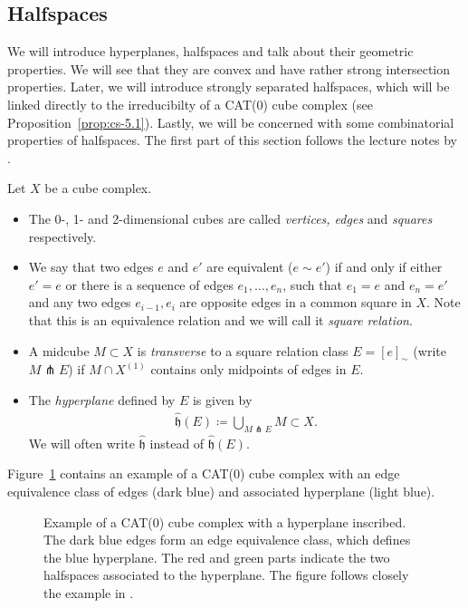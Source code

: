 \subsection{Halfspaces}
\label{sec:halfspaces}
We will introduce hyperplanes, halfspaces and talk about their geometric properties. We will see that they are convex and have rather strong intersection properties. Later, we will introduce strongly separated halfspaces, which will be linked directly to the irreducibilty of a CAT(0) cube complex (see Proposition~\ref{prop:cs-5.1}). Lastly, we will be concerned with some combinatorial properties of halfspaces. The first part of this section follows the lecture notes by \textcite{Rolli2012}.

\begin{defin}[Hyperplanes]
  Let \(X\) be a cube complex.
  \begin{itemize}
  \item The 0-, 1- and 2-dimensional cubes are called \emph{vertices, edges} and \emph{squares} respectively.
  \item We say that two edges \(e\) and \(e'\) are equivalent (\(e \sim e'\)) if and only if either \(e' = e\) or there is a sequence of edges \(e_1, \dots, e_n\), such that \(e_1 = e\) and \(e_n = e'\) and any two edges \(e_{i-1}, e_i\) are opposite edges in a common square in \(X\). Note that this is an equivalence relation and we will call it \emph{square relation}.
  \item A midcube \(M \subset X\) is \emph{transverse} to a square relation class \(E = [e]_\sim\) (write \(M \pitchfork E\)) if \(M \cap X^{(1)}\) contains only midpoints of edges in \(E\).
  \item The \emph{hyperplane} defined by \(E\) is given by
    \begin{align*}
      \mathfrak{\hat h}(E) \coloneqq \bigcup_{M \pitchfork E} M \subset X.
    \end{align*}
    We will often write \(\mathfrak{\hat h}\) instead of \(\mathfrak{\hat h}(E)\).
  \end{itemize}
\end{defin}

\begin{bsp}
  Figure~\ref{fig:hyperplanes} contains an example of a CAT(0) cube complex with an edge equivalence class of edges (dark blue) and associated hyperplane (light blue). 
  \begin{figure}[htbp]
    \centering
    
    \caption{Example of a CAT(0) cube complex with a hyperplane inscribed. The dark blue edges form an edge equivalence class, which defines the blue hyperplane. The red and green parts indicate the two halfspaces associated to the hyperplane. The figure follows closely the example in \textcite{sageev-lecture-notes}.}
    \label{fig:hyperplanes}
  \end{figure}
\end{bsp}

